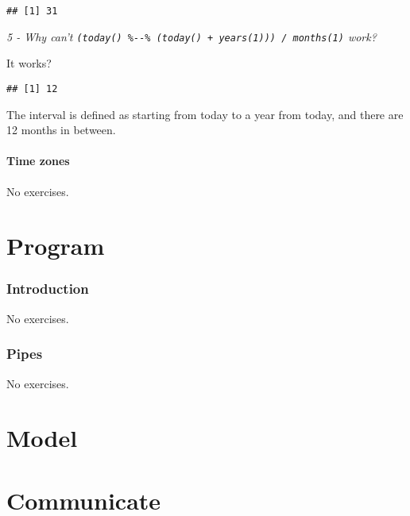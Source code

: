\documentclass[]{article}
\newenvironment{Shaded}{\begin{snugshade}}{\end{snugshade}}
\newcommand{\KeywordTok}[1]{\textcolor[rgb]{0.13,0.29,0.53}{\textbf{#1}}}
\newcommand{\DecValTok}[1]{\textcolor[rgb]{0.00,0.00,0.81}{#1}}
\newcommand{\StringTok}[1]{\textcolor[rgb]{0.31,0.60,0.02}{#1}}
\newcommand{\OperatorTok}[1]{\textcolor[rgb]{0.81,0.36,0.00}{\textbf{#1}}}
\newcommand{\NormalTok}[1]{#1}
\theoremstyle{definition}
\theoremstyle{definition}
\theoremstyle{definition}
\theoremstyle{remark}
\begin{document}
\begin{verbatim}
## [1] 31
\end{verbatim}

\emph{5 - Why can't
\texttt{(today()\ \%-\/-\%\ (today()\ +\ years(1)))\ /\ months(1)}
work?}

It works?

\begin{Shaded}
\end{Shaded}

\begin{verbatim}
## [1] 12
\end{verbatim}

The interval is defined as starting from today to a year from today, and
there are 12 months in between.

\subsection{Time zones}\label{time-zones}

No exercises.

\part{Program}\label{part-program}

\section{Introduction}\label{introduction-13}

No exercises.

\section{Pipes}\label{pipes}

No exercises.

\part{Model}\label{part-model}

\part{Communicate}\label{part-communicate}
\end{document}
